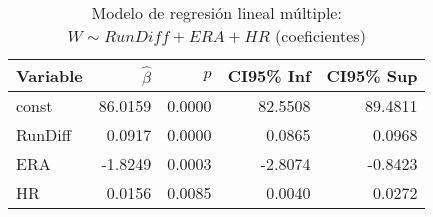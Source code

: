 \begin{table}
\caption{Modelo de regresión lineal múltiple: $W \sim RunDiff + ERA + HR$ (coeficientes)}
\label{tab:ols_multiple_coef}
\begin{tabular}{lrrrr}
\toprule
Variable & $\hat{\beta}$ & $p$ & CI95\% Inf & CI95\% Sup \\
\midrule
const & 86.0159 & 0.0000 & 82.5508 & 89.4811 \\
RunDiff & 0.0917 & 0.0000 & 0.0865 & 0.0968 \\
ERA & -1.8249 & 0.0003 & -2.8074 & -0.8423 \\
HR & 0.0156 & 0.0085 & 0.0040 & 0.0272 \\
\bottomrule
\end{tabular}
\end{table}
